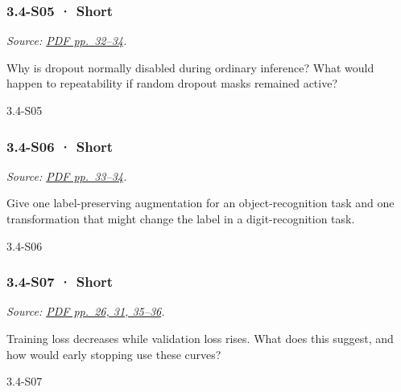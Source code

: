 \noindent\begin{minipage}{\linewidth}

\subsubsection{3.4-S05 · Short}\label{s05-short-10}

\emph{Source:
\href{../Lecture\%20Slides/3.4.\%20Deep\%20Learning\%20Fundamentals\%20II.pdf\#page=32}{PDF
pp.~32--34}.}

Why is dropout normally disabled during ordinary inference? What would
happen to repeatability if random dropout masks remained active?

\begin{solution}[20mm]{3.4-S05}

\end{solution}
\end{minipage}\par\medskip

\noindent\begin{minipage}{\linewidth}

\subsubsection{3.4-S06 · Short}\label{s06-short-10}

\emph{Source:
\href{../Lecture\%20Slides/3.4.\%20Deep\%20Learning\%20Fundamentals\%20II.pdf\#page=33}{PDF
pp.~33--34}.}

Give one label-preserving augmentation for an object-recognition task
and one transformation that might change the label in a
digit-recognition task.

\begin{solution}[20mm]{3.4-S06}

\end{solution}
\end{minipage}\par\medskip

\noindent\begin{minipage}{\linewidth}

\subsubsection{3.4-S07 · Short}\label{s07-short-10}

\emph{Source:
\href{../Lecture\%20Slides/3.4.\%20Deep\%20Learning\%20Fundamentals\%20II.pdf\#page=26}{PDF
pp.~26, 31, 35--36}.}

Training loss decreases while validation loss rises. What does this
suggest, and how would early stopping use these curves?

\begin{solution}[20mm]{3.4-S07}

\end{solution}
\end{minipage}\par\medskip

